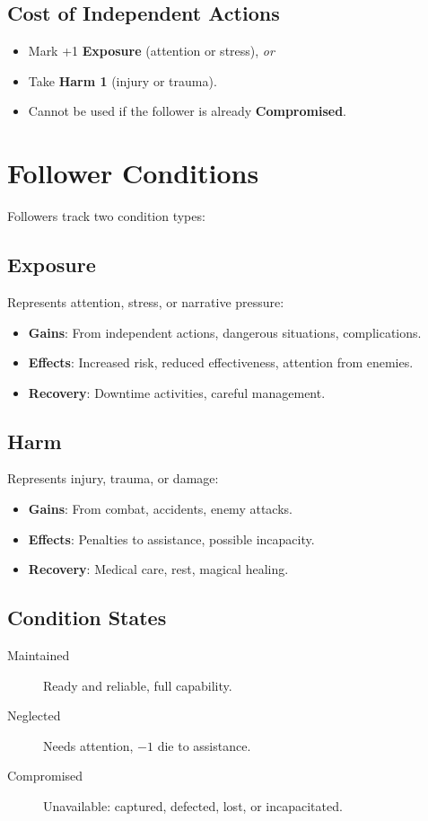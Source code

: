 \begin{multicols}{2}
\subsection*{Cost of Independent Actions}
\begin{itemize}
\item Mark +1 \textbf{Exposure} (attention or stress), \emph{or}
\item Take \textbf{Harm 1} (injury or trauma).
\item Cannot be used if the follower is already \textbf{Compromised}.
\end{itemize}

\section{Follower Conditions}

Followers track two condition types:

\subsection*{Exposure}
Represents attention, stress, or narrative pressure:
\begin{itemize}
\item \textbf{Gains}: From independent actions, dangerous situations, complications.
\item \textbf{Effects}: Increased risk, reduced effectiveness, attention from enemies.
\item \textbf{Recovery}: Downtime activities, careful management.
\end{itemize}

\subsection*{Harm}
Represents injury, trauma, or damage:
\begin{itemize}
\item \textbf{Gains}: From combat, accidents, enemy attacks.
\item \textbf{Effects}: Penalties to assistance, possible incapacity.
\item \textbf{Recovery}: Medical care, rest, magical healing.
\end{itemize}

\subsection*{Condition States}
\begin{description}
\item[Maintained] Ready and reliable, full capability.
\item[Neglected] Needs attention, $-1$ die to assistance.
\item[Compromised] Unavailable: captured, defected, lost, or incapacitated.
\end{description}


\end{multicols}
